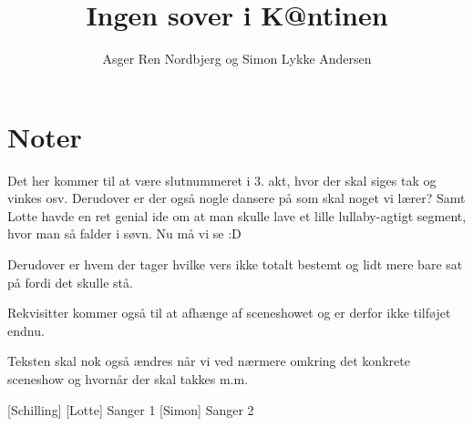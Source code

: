 \documentclass{article}
\title{Ingen sover i K@ntinen}                   %
\author{Asger Ren Nordbjerg og Simon Lykke Andersen}  %
\begin{document}
                
\maketitle
\section*{Noter}                %
Det her kommer til at være slutnummeret i 3. akt, hvor der skal siges tak og vinkes osv.
Derudover er der også nogle dansere på som skal noget vi lærer?
Samt Lotte havde en ret genial ide om at man skulle lave et lille lullaby-agtigt segment, hvor man så falder i søvn. Nu må vi se :D

Derudover er hvem der tager hvilke vers ikke totalt bestemt og lidt mere bare sat på fordi det skulle stå.

Rekvisitter kommer også til at afhænge af sceneshowet og er derfor ikke tilføjet endnu.

Teksten skal nok også ændres når vi ved nærmere omkring det konkrete sceneshow og hvornår der skal takkes m.m.

\begin{roles}
[Schilling]
[Lotte] Sanger 1
[Simon] Sanger 2
\end{roles}
\end{document}

